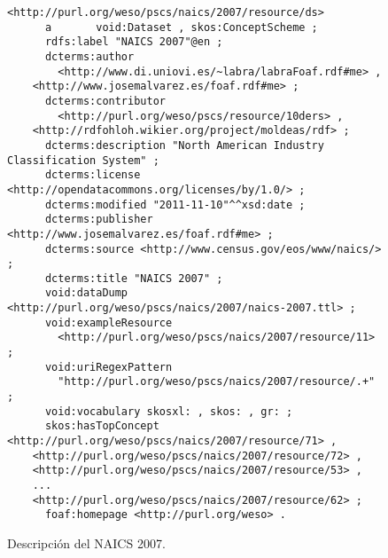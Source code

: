 \begin{figure}[!htp]
\begin{lstlisting} 
<http://purl.org/weso/pscs/naics/2007/resource/ds>
      a       void:Dataset , skos:ConceptScheme ;
      rdfs:label "NAICS 2007"@en ;
      dcterms:author 
        <http://www.di.uniovi.es/~labra/labraFoaf.rdf#me> , 
	<http://www.josemalvarez.es/foaf.rdf#me> ;
      dcterms:contributor
        <http://purl.org/weso/pscs/resource/10ders> ,
	<http://rdfohloh.wikier.org/project/moldeas/rdf> ;    
      dcterms:description "North American Industry Classification System" ;
      dcterms:license <http://opendatacommons.org/licenses/by/1.0/> ;
      dcterms:modified "2011-11-10"^^xsd:date ;
      dcterms:publisher <http://www.josemalvarez.es/foaf.rdf#me> ;
      dcterms:source <http://www.census.gov/eos/www/naics/> ;
      dcterms:title "NAICS 2007" ;
      void:dataDump <http://purl.org/weso/pscs/naics/2007/naics-2007.ttl> ;
      void:exampleResource
        <http://purl.org/weso/pscs/naics/2007/resource/11> ;
      void:uriRegexPattern
        "http://purl.org/weso/pscs/naics/2007/resource/.+" ;
      void:vocabulary skosxl: , skos: , gr: ;
      skos:hasTopConcept <http://purl.org/weso/pscs/naics/2007/resource/71> , 
	<http://purl.org/weso/pscs/naics/2007/resource/72> , 
	<http://purl.org/weso/pscs/naics/2007/resource/53> , 
	...
	<http://purl.org/weso/pscs/naics/2007/resource/62> ;
      foaf:homepage <http://purl.org/weso> .
\end{lstlisting}
	\caption{Descripción del \dataset NAICS 2007.}
	\label{fig:pscs-ds-cpa-2008}
\end{figure}




